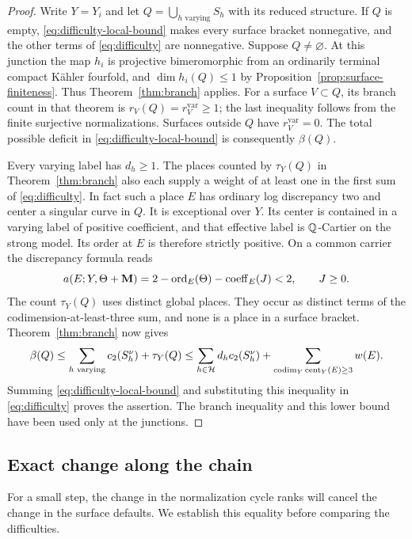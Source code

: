 \begin{proof}
Write \(Y=Y_i\) and let
\(Q=\bigcup_{h\text{ varying}}S_h\) with its reduced structure.  If
\(Q\) is empty, \eqref{eq:difficulty-local-bound} makes every surface
bracket nonnegative, and the other terms of \eqref{eq:difficulty} are
nonnegative.  Suppose \(Q\ne\varnothing\).  At this junction the map
\(h_i\) is projective bimeromorphic from an ordinarily terminal compact
K\"ahler fourfold, and \(\dim h_i(Q)\leq1\) by
Proposition~\ref{prop:surface-finiteness}.  Thus Theorem~\ref{thm:branch}
applies.  For a surface \(V\subset Q\), its branch count in that theorem
is \(r_V(Q)=r_V^{\mathrm{var}}\geq1\); the last inequality follows from
the finite surjective normalizations.  Surfaces outside \(Q\) have
\(r_V^{\mathrm{var}}=0\).  The total possible deficit in
\eqref{eq:difficulty-local-bound} is consequently \(\beta(Q)\).

Every varying label has \(d_h\geq1\).  The places counted by
\(\tau_Y(Q)\) in Theorem~\ref{thm:branch} also each supply a weight of at
least one in the first sum of \eqref{eq:difficulty}.  In fact such a place
\(E\) has ordinary log discrepancy two and center a singular curve in
\(Q\).  It is exceptional over \(Y\).  Its center is contained in a
varying label of positive coefficient, and that effective label is
\(\mathbb{Q}\)-Cartier on the strong model.  Its order at \(E\) is therefore
strictly positive.  On a common carrier the discrepancy formula reads
\[
 a(E;Y,\Theta+\mathbf{M})
 =2-\operatorname{ord}_E(\Theta)-\operatorname{coeff}_E(J)<2,
 \qquad J\geq0.
\]
The count \(\tau_Y(Q)\) uses distinct global places.  They occur as
distinct terms of the codimension-at-least-three sum, and none is a place
in a surface bracket.  Theorem~\ref{thm:branch} now gives
\[
 \beta(Q)
 \leq\sum_{h\text{ varying}}c_2(S_h^\nu)+\tau_Y(Q)
 \leq\sum_{h\in\mathcal H}d_hc_2(S_h^\nu)
       +\sum_{\operatorname{codim}_Y\operatorname{cent}_Y(E)\geq3}w(E).
\]
Summing \eqref{eq:difficulty-local-bound} and substituting this inequality
in \eqref{eq:difficulty} proves the assertion.  The branch inequality and
this lower bound have been used only at the junctions.
\end{proof}

\subsection{Exact change along the chain}

For a small step, the change in the normalization cycle ranks will cancel
the change in the surface defaults.  We establish this equality before
comparing the difficulties.

